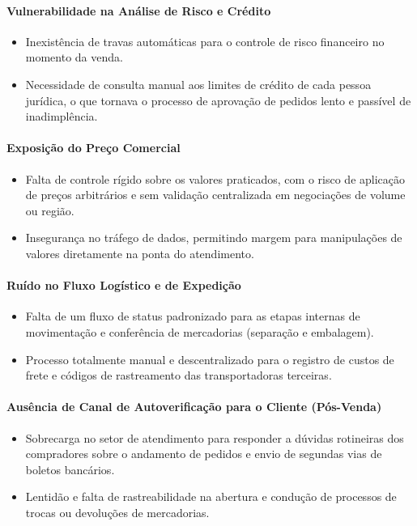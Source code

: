 \documentclass[12pt,a4paper]{article}
\begin{document}
\paragraph*{Vulnerabilidade na Análise de Risco e Crédito}
\begin{itemize}
  \item Inexistência de travas automáticas para o controle de risco financeiro no momento da venda.
  \item Necessidade de consulta manual aos limites de crédito de cada pessoa jurídica, o que tornava o processo de aprovação de pedidos lento e passível de inadimplência.
\end{itemize}

\paragraph*{Exposição do Preço Comercial}
\begin{itemize}
  \item Falta de controle rígido sobre os valores praticados, com o risco de aplicação de preços arbitrários e sem validação centralizada em negociações de volume ou região.
  \item Insegurança no tráfego de dados, permitindo margem para manipulações de valores diretamente na ponta do atendimento.
\end{itemize}

\paragraph*{Ruído no Fluxo Logístico e de Expedição}
\begin{itemize}
  \item Falta de um fluxo de status padronizado para as etapas internas de movimentação e conferência de mercadorias (separação e embalagem).
  \item Processo totalmente manual e descentralizado para o registro de custos de frete e códigos de rastreamento das transportadoras terceiras.
\end{itemize}

\paragraph*{Ausência de Canal de Autoverificação para o Cliente (Pós-Venda)}
\begin{itemize}
  \item Sobrecarga no setor de atendimento para responder a dúvidas rotineiras dos compradores sobre o andamento de pedidos e envio de segundas vias de boletos bancários.
  \item Lentidão e falta de rastreabilidade na abertura e condução de processos de trocas ou devoluções de mercadorias.
\end{itemize}
\end{document}
